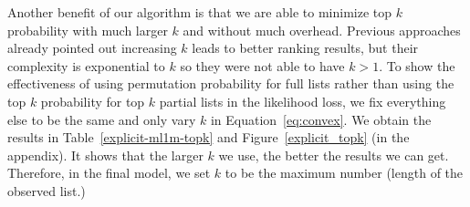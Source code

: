 \documentclass{article}
\begin{document}
Another benefit of our algorithm is that we are able to minimize top $k$ probability with much larger $k$ and without much overhead. Previous approaches 
\cite{huang2015listwise}
already pointed out increasing $k$ leads to better ranking results, but
their complexity is exponential to $k$ so they were not able to have $k > 1$. 
To show the effectiveness of using permutation probability for full lists rather than using the top $k$ probability for top $k$ partial lists in the likelihood loss, we fix everything else to be the same and only vary $k$ in Equation~\eqref{eq:convex}. We obtain the results in Table~\ref{explicit-ml1m-topk} and Figure~\ref{explicit_topk} (in the appendix). It shows that the larger $k$ we use, the better the results we can get. Therefore, in the final model, we set $k$ to be the maximum number (length of the  observed list.)   



\end{document}

